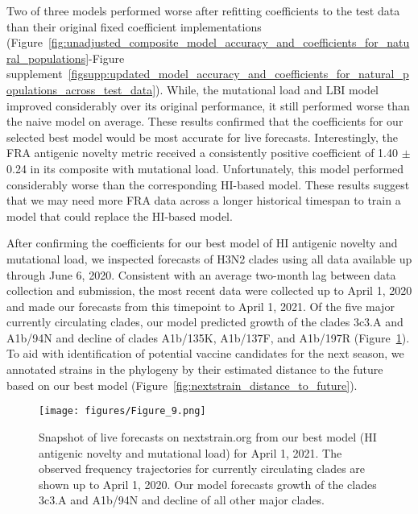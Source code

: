 Two of three models performed worse after refitting coefficients to the test data than their original fixed coefficient implementations (Figure~\ref{fig:unadjusted_composite_model_accuracy_and_coefficients_for_natural_populations}-Figure supplement~\ref{figsupp:updated_model_accuracy_and_coefficients_for_natural_populations_across_test_data}).
While, the mutational load and LBI model improved considerably over its original performance, it still performed worse than the naive model on average.
These results confirmed that the coefficients for our selected best model would be most accurate for live forecasts.
Interestingly, the FRA antigenic novelty metric received a consistently positive coefficient of 1.40 $\pm$ 0.24 in its composite with mutational load.
Unfortunately, this model performed considerably worse than the corresponding HI-based model.
These results suggest that we may need more FRA data across a longer historical timespan to train a model that could replace the HI-based model.

After confirming the coefficients for our best model of HI antigenic novelty and mutational load, we inspected forecasts of H3N2 clades using all data available up through June 6, 2020.
Consistent with an average two-month lag between data collection and submission, the most recent data were collected up to April 1, 2020 and made our forecasts from this timepoint to April 1, 2021.
Of the five major currently circulating clades, our model predicted growth of the clades 3c3.A and A1b/94N and decline of clades A1b/135K, A1b/137F, and A1b/197R (Figure~\ref{fig:nextstrain_forecasts}).
To aid with identification of potential vaccine candidates for the next season, we annotated strains in the phylogeny by their estimated distance to the future based on our best model (Figure~\ref{fig:nextstrain_distance_to_future}).

\begin{figure}[htb]
  \begin{center}
  \texttt{[image: figures/Figure\_9.png]}
  \caption{
    Snapshot of live forecasts on nextstrain.org from our best model (HI antigenic novelty and mutational load) for April 1, 2021.
    The observed frequency trajectories for currently circulating clades are shown up to April 1, 2020.
    Our model forecasts growth of the clades 3c3.A and A1b/94N and decline of all other major clades.
  }
  \label{fig:nextstrain_forecasts}
  \end{center}
\end{figure}

